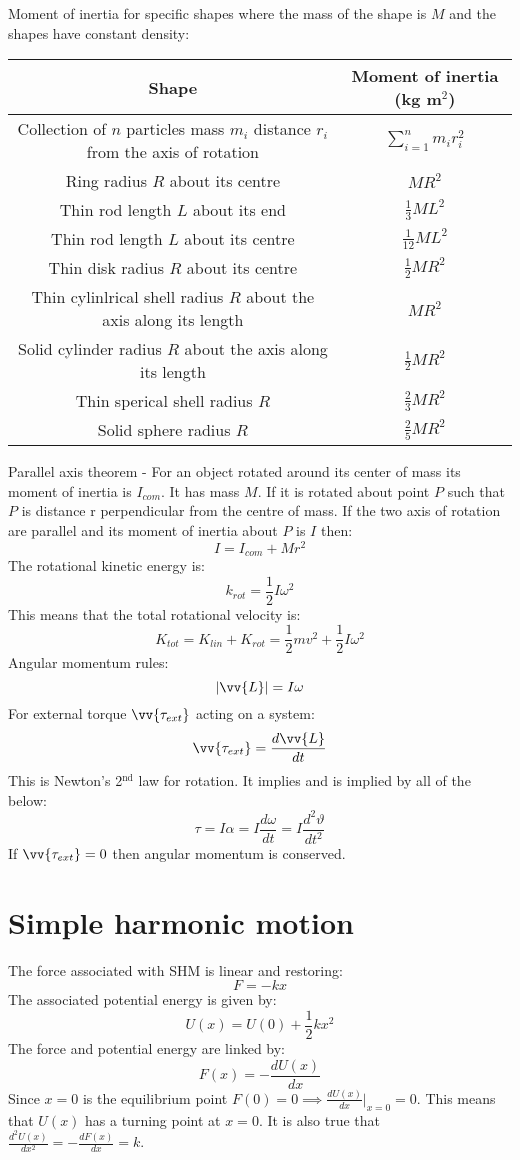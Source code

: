 \documentclass{article}
\begin{document}
Moment of inertia for specific shapes where the mass of the shape is \(M\) and the shapes have constant density:
\begin{center}
\begin{tabular}{|c|c|}\hline
Shape & Moment of inertia (kg m\(^2\))\\ \hline
Collection of \(n\) particles mass \(m_i\) distance \(r_i\) from the axis of rotation & \(\sum_{i=1}^nm_ir_i^2\)\\
Ring radius \(R\) about its centre & \(MR^2\)\\
Thin rod length \(L\) about its end & \(\frac{1}{3}ML^2\)\\
Thin rod length \(L\) about its centre & \(\frac{1}{12}ML^2\)\\
Thin disk radius \(R\) about its centre & \(\frac{1}{2}MR^2\)\\
Thin cylinlrical shell radius \(R\) about the axis along its length & \(MR^2\)\\
Solid cylinder radius \(R\) about the axis along its length & \(\frac12MR^2\)\\
Thin sperical shell radius \(R\) & \(\frac23MR^2\)\\
Solid sphere radius \(R\) & \(\frac25MR^2\)\\
\hline
\end{tabular}
\end{center}
Parallel axis theorem - For an object rotated around its center of mass its moment of inertia is \(I_{com}\). It has mass \(M\). If it is rotated about point \(P\) such that \(P\) is distance r perpendicular from the centre of mass. If the two axis of rotation are parallel and its moment of inertia about \(P\) is \(I\) then:
\[I=I_{com}+Mr^2\]
The rotational kinetic energy is:
\[k_{rot}=\frac{1}{2}I\omega^2\]
This means that the total rotational velocity is:
\[K_{tot}=K_{lin}+K_{rot}=\frac{1}{2}mv^2+\frac{1}{2}I\omega^2\]
Angular momentum rules:
\[|\vv{L}|=I\omega\]
For external torque \(\vv{\tau_{ext}}\) acting on a system:
\[\vv{\tau_{ext}}=\frac{d\vv{L}}{dt}\]
This is Newton's 2\(^\text{nd}\) law for rotation. It implies and is implied by all of the below:
\[\tau = I\alpha = I\frac{d\omega}{dt} = I\frac{d^2\vartheta}{dt^2}\]
If \(\vv{\tau_{ext}}=0\) then angular momentum is conserved.

\section*{Simple harmonic motion}

The force associated with SHM is linear and restoring:
\[F=-kx\]
The associated potential energy is given by:
\[U(x)=U(0)+\frac12kx^2\]
The force and potential energy are linked by:
\[F(x)=-\frac{dU(x)}{dx}\]
Since \(x=0\) is the equilibrium point \(F(0)=0\implies \frac{dU(x)}{dx}|_{x=0}=0\). This means that \(U(x)\) has a turning point at \(x=0\). It is also true that \(\frac{d^2U(x)}{dx^2}=-\frac{dF(x)}{dx}=k\). 
\end{document}
